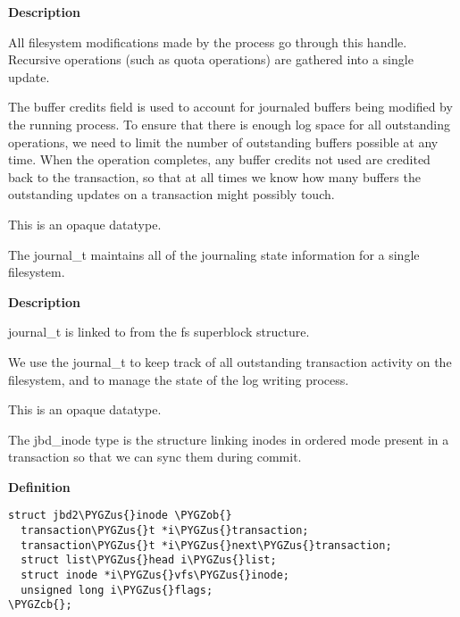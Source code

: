 \documentclass[a4paper,8pt,english]{sphinxmanual}
\def\PYGZus{\char`\_}
\def\PYGZob{\char`\{}
\def\PYGZcb{\char`\}}
\begin{document}
\textbf{Description}

All filesystem modifications made by the process go
through this handle.  Recursive operations (such as quota operations)
are gathered into a single update.

The buffer credits field is used to account for journaled buffers
being modified by the running process.  To ensure that there is
enough log space for all outstanding operations, we need to limit the
number of outstanding buffers possible at any time.  When the
operation completes, any buffer credits not used are credited back to
the transaction, so that at all times we know how many buffers the
outstanding updates on a transaction might possibly touch.

This is an opaque datatype.

\begin{fulllineitems}
\label{filesystems/index:c.journal_t}
The journal\_t maintains all of the journaling state information for a single filesystem.

\end{fulllineitems}


\textbf{Description}

journal\_t is linked to from the fs superblock structure.

We use the journal\_t to keep track of all outstanding transaction
activity on the filesystem, and to manage the state of the log
writing process.

This is an opaque datatype.

\begin{fulllineitems}
\label{filesystems/index:c.jbd2_inode}
The jbd\_inode type is the structure linking inodes in ordered mode present in a transaction so that we can sync them during commit.

\end{fulllineitems}


\textbf{Definition}

\begin{Verbatim}[commandchars=\\\{\}]
struct jbd2\PYGZus{}inode \PYGZob{}
  transaction\PYGZus{}t *i\PYGZus{}transaction;
  transaction\PYGZus{}t *i\PYGZus{}next\PYGZus{}transaction;
  struct list\PYGZus{}head i\PYGZus{}list;
  struct inode *i\PYGZus{}vfs\PYGZus{}inode;
  unsigned long i\PYGZus{}flags;
\PYGZcb{};
\end{Verbatim}
\end{document}
